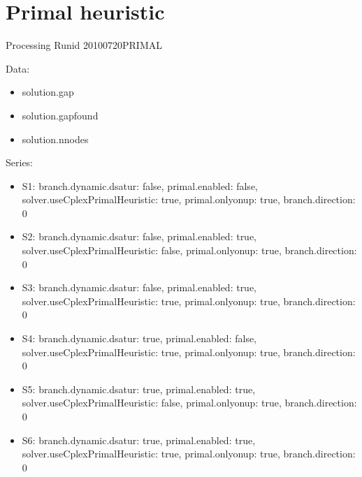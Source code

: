 \documentclass[landscape, 12pt]{report}
\begin{document}
	
	\section{Primal heuristic}
	
	Processing Runid 20100720PRIMAL

Data:
\begin{itemize}
\item solution.gap
\item solution.gapfound
\item solution.nnodes
\end{itemize}
Series:
\begin{itemize}
\item S1: branch.dynamic.dsatur: false, primal.enabled: false, solver.useCplexPrimalHeuristic: true, primal.onlyonup: true, branch.direction: 0
\item S2: branch.dynamic.dsatur: false, primal.enabled: true, solver.useCplexPrimalHeuristic: false, primal.onlyonup: true, branch.direction: 0
\item S3: branch.dynamic.dsatur: false, primal.enabled: true, solver.useCplexPrimalHeuristic: true, primal.onlyonup: true, branch.direction: 0
\item S4: branch.dynamic.dsatur: true, primal.enabled: false, solver.useCplexPrimalHeuristic: true, primal.onlyonup: true, branch.direction: 0
\item S5: branch.dynamic.dsatur: true, primal.enabled: true, solver.useCplexPrimalHeuristic: false, primal.onlyonup: true, branch.direction: 0
\item S6: branch.dynamic.dsatur: true, primal.enabled: true, solver.useCplexPrimalHeuristic: true, primal.onlyonup: true, branch.direction: 0
\end{itemize}
\end{document}
